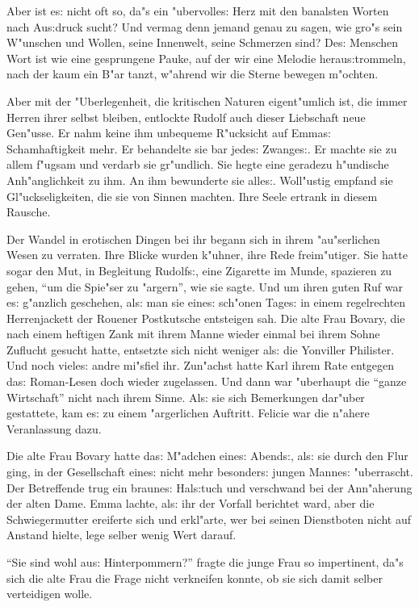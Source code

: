 \documentclass[oneside,12pt]{book}
\newcommand{\s}{s:}%
\begin{document}
Aber ist e{\s} nicht oft so, da"s ein "ubervolle{\s} Herz mit den
banalsten Worten nach Au{\s}druck sucht? Und vermag denn jemand
genau zu sagen, wie gro"s sein W"unschen und Wollen, seine
Innenwelt, seine Schmerzen sind? De{\s} Menschen Wort ist wie eine
gesprungene Pauke, auf der wir eine Melodie herau{\s}trommeln,
nach der kaum ein B"ar tanzt, w"ahrend wir die Sterne bewegen
m"ochten.

Aber mit der "Uberlegenheit, die kritischen Naturen eigent"umlich
ist, die immer Herren ihrer selbst bleiben, entlockte Rudolf auch
dieser Liebschaft neue Gen"usse. Er nahm keine ihm unbequeme
R"ucksicht auf Emma{\s} Schamhaftigkeit mehr. Er behandelte sie
bar jede{\s} Zwange{\s}. Er machte sie zu allem f"ugsam und
verdarb sie gr"undlich. Sie hegte eine geradezu h"undische
Anh"anglichkeit zu ihm. An ihm bewunderte sie alle{\s}. Woll"ustig
empfand sie Gl"uckseligkeiten, die sie von Sinnen machten. Ihre
Seele ertrank in diesem Rausche.

Der Wandel in erotischen Dingen bei ihr begann sich in ihrem
"au"serlichen Wesen zu verraten. Ihre Blicke wurden k"uhner, ihre
Rede freim"utiger. Sie hatte sogar den Mut, in Begleitung
Rudolf{\s}, eine Zigarette im Munde, spazieren zu gehen, "`um die
Spie"ser zu "argern"', wie sie sagte. Und um ihren guten Ruf war
e{\s} g"anzlich geschehen, al{\s} man sie eine{\s} sch"onen
Tage{\s} in einem regelrechten Herrenjackett der Rouener
Postkutsche entsteigen sah. Die alte Frau Bovary, die nach einem
heftigen Zank mit ihrem Manne wieder einmal bei ihrem Sohne
Zuflucht gesucht hatte, entsetzte sich nicht weniger al{\s} die
Yonviller Philister. Und noch viele{\s} andre mi"sfiel ihr.
Zun"achst hatte Karl ihrem Rate entgegen da{\s} Roman-Lesen doch
wieder zugelassen. Und dann war "uberhaupt die "`ganze
Wirtschaft"' nicht nach ihrem Sinne. Al{\s} sie sich Bemerkungen
dar"uber gestattete, kam e{\s} zu einem "argerlichen Auftritt.
Felicie war die n"ahere Veranlassung dazu.

Die alte Frau Bovary hatte da{\s} M"adchen eine{\s} Abend{\s},
al{\s} sie durch den Flur ging, in der Gesellschaft eine{\s} nicht
mehr besonder{\s} jungen Manne{\s} "uberrascht. Der Betreffende
trug ein braune{\s} Hal{\s}tuch und verschwand bei der Ann"aherung
der alten Dame. Emma lachte, al{\s} ihr der Vorfall berichtet
ward, aber die Schwiegermutter ereiferte sich und erkl"arte, wer
bei seinen Dienstboten nicht auf Anstand hielte, lege selber wenig
Wert darauf.

"`Sie sind wohl au{\s} Hinterpommern?"' fragte die junge Frau so
impertinent, da"s sich die alte Frau die Frage nicht verkneifen
konnte, ob sie sich damit selber verteidigen wolle.
\end{document}

